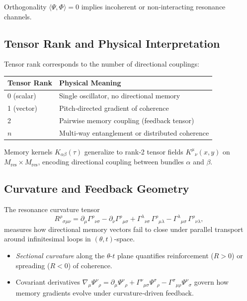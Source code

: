 Orthogonality \(\langle\Psi,\Phi\rangle=0\) implies incoherent or non‐interacting resonance channels.

\subsection{Tensor Rank and Physical Interpretation}

Tensor rank corresponds to the number of directional couplings:

\begin{center}
\begin{tabular}{@{}ll@{}}
\toprule
Tensor Rank & Physical Meaning \\
\midrule
0 (scalar)   & Single oscillator, no directional memory \\
1 (vector)   & Pitch‐directed gradient of coherence \\
2            & Pairwise memory coupling (feedback tensor) \\
\(n\)        & Multi‐way entanglement or distributed coherence \\
\bottomrule
\end{tabular}
\end{center}

Memory kernels \(K_{\alpha\beta}(\tau)\) generalize to rank‐2 tensor fields \(K^{\mu}{}_{\nu}(x,y)\) on \(M_{\mathrm{res}}\times M_{\mathrm{res}}\), encoding directional coupling between bundles \(\alpha\) and \(\beta\).

\subsection{Curvature and Feedback Geometry}

The resonance curvature tensor
\[
  R^{\rho}{}_{\sigma\mu\nu}
  = \partial_{\mu}\Gamma^{\rho}{}_{\nu\sigma}
    - \partial_{\nu}\Gamma^{\rho}{}_{\mu\sigma}
    + \Gamma^{\lambda}{}_{\nu\sigma}\,\Gamma^{\rho}{}_{\mu\lambda}
    - \Gamma^{\lambda}{}_{\mu\sigma}\,\Gamma^{\rho}{}_{\nu\lambda},
\]
measures how directional memory vectors fail to close under parallel transport around infinitesimal loops in \((\theta,t)\)-space.  

\begin{itemize}
  \item \emph{Sectional curvature} along the \(\theta\)-\(t\) plane quantifies reinforcement (\(R>0\)) or spreading (\(R<0\)) of coherence.
  \item Covariant derivatives \(\nabla_{\mu}\Psi^{\nu}{}_{\rho} = \partial_{\mu}\Psi^{\nu}{}_{\rho}
     + \Gamma^{\nu}{}_{\mu\sigma}\Psi^{\sigma}{}_{\rho}
     - \Gamma^{\sigma}{}_{\mu\rho}\Psi^{\nu}{}_{\sigma}\) govern how memory gradients evolve under curvature‐driven feedback.
\end{itemize}

